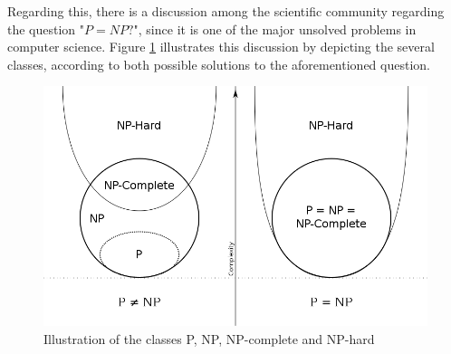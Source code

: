 Regarding this, there is a discussion among the scientific community regarding the question "$P=NP?$",
since it is one of the major unsolved problems in computer science.
Figure \ref{fig:p_vs_np} illustrates this discussion by depicting the several classes, according to both possible solutions to the aforementioned question.
\begin{figure}[htpb]
  \centering
  \includegraphics[width=.6\textwidth]{Figures/2.Chapter/p_vs_np.png}
	\caption{Illustration of the classes P, NP, NP-complete and NP-hard}
  \label{fig:p_vs_np}  
\end{figure}



